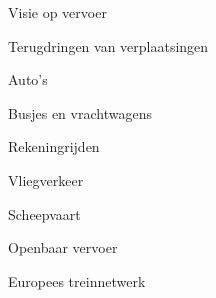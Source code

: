 
\begin{visie-concept}{Visie op vervoer}\end{visie-concept}

\begin{voorstel-concept}{Terugdringen van verplaatsingen}\end{voorstel-concept}
\begin{voorstel-concept}{Auto’s}\end{voorstel-concept}
\begin{voorstel-concept}{Busjes en vrachtwagens}\end{voorstel-concept}
\begin{voorstel-concept}{Rekeningrijden}\end{voorstel-concept}
\begin{voorstel-concept}{Vliegverkeer}\end{voorstel-concept}
\begin{voorstel-concept}{Scheepvaart}\end{voorstel-concept}
\begin{voorstel-concept}{Openbaar vervoer}\end{voorstel-concept}
\begin{voorstel-concept}{Europees treinnetwerk}\end{voorstel-concept}
